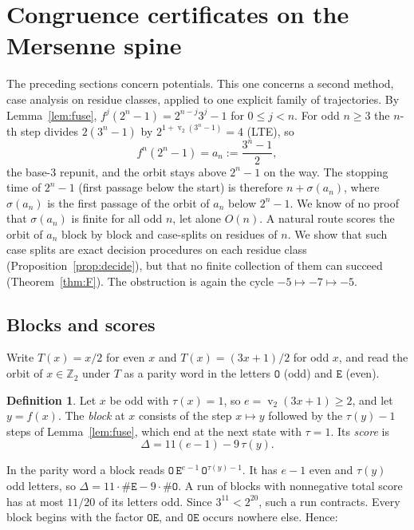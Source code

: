 \documentclass[11pt]{article}
\theoremstyle{definition}
\newtheorem{definition}[theorem]{Definition}
\theoremstyle{remark}
\newcommand{\Z}{\mathbb{Z}}
\DeclareMathOperator{\vv}{v}
\begin{document}
\section{Congruence certificates on the Mersenne spine}\label{sec:spine}

The preceding sections concern potentials. This one concerns a second
method, case analysis on residue classes, applied to one explicit family
of trajectories. By Lemma~\ref{lem:fuse}, $f^{j}(2^{n}-1)=2^{n-j}3^{j}-1$
for $0\le j<n$. For odd $n\ge3$ the $n$-th step divides
$2(3^{n}-1)$ by $2^{1+\vv_2(3^n-1)}=4$ (LTE), so
\[
f^{n}(2^{n}-1)=a_n:=\frac{3^{n}-1}{2},
\]
the base-$3$ repunit, and the orbit stays above $2^{n}-1$ on the way.
The stopping time of $2^{n}-1$ (first passage below the start) is
therefore $n+\sigma(a_n)$, where $\sigma(a_n)$ is the first passage of
the orbit of $a_n$ below $2^{n}-1$. We know of no proof that
$\sigma(a_n)$ is finite for all odd $n$, let alone $O(n)$. A natural
route scores the orbit of $a_n$ block by block and case-splits on
residues of $n$. We show that such case splits are exact decision
procedures on each residue class (Proposition~\ref{prop:decide}), but
that no finite collection of them can succeed (Theorem~\ref{thm:F}).
The obstruction is again the cycle $-5\mapsto-7\mapsto-5$.

\subsection*{Blocks and scores}

Write $T(x)=x/2$ for even $x$ and $T(x)=(3x+1)/2$ for odd $x$, and read
the orbit of $x\in\Z_2$ under $T$ as a parity word in the letters
$\mathtt O$ (odd) and $\mathtt E$ (even).

\begin{definition}\label{def:block}
Let $x$ be odd with $\tau(x)=1$, so $e=\vv_2(3x+1)\ge2$, and let
$y=f(x)$. The \emph{block} at $x$ consists of the step $x\mapsto y$
followed by the $\tau(y)-1$ steps of Lemma~\ref{lem:fuse}, which end at
the next state with $\tau=1$. Its \emph{score} is
\[
\Delta=11(e-1)-9\,\tau(y).
\]
\end{definition}

In the parity word a block reads
$\mathtt O\,\mathtt E^{e-1}\,\mathtt O^{\tau(y)-1}$. It has $e-1$ even
and $\tau(y)$ odd letters, so $\Delta=11\cdot\#\mathtt E-9\cdot\#\mathtt O$.
A run of blocks with nonnegative total score has at most $11/20$ of its
letters odd. Since $3^{11}<2^{20}$, such a run contracts.
Every block begins with the factor $\mathtt{OE}$, and $\mathtt{OE}$
occurs nowhere else. Hence:
\end{document}

